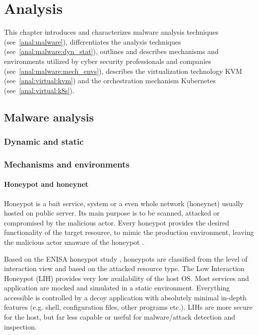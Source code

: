 \chapter{Analysis \label{anal}}
This chapter introduces and characterizes malware analysis techniques (see~\autoref{anal:malware}), differentiates the analysis techniques (see~\autoref{anal:malware:dyn_stat}), outlines and describes mechanisms and environments utilized by cyber security professionals and companies (see~\autoref{anal:malware:mech_envs}), describes the virtualization technology KVM (see~\autoref{anal:virtual:kvm}) and the orchestration mechanism Kubernetes (see~\autoref{anal:virtual:k8s}).\par

\section{Malware analysis \label{anal:malware}}

\subsection{Dynamic and static \label{anal:malware:dyn_stat}}

\subsection{Mechanisms and environments \label{anal:malware:mech_envs}}

\subsubsection{Honeypot and honeynet \label{anal:malware:mech_envs:hons}}
Honeypot is a bait service, system or a even whole network (honeynet) usually hosted on public server. Its main purpose is to be scanned, attacked or compromised by the malicious actor. Every honeypot provides the desired functionality of the target resource, to mimic the production environment, leaving the malicious actor unaware of the honeypot \cite{study:enisa_honeypots}.\par

Based on the ENISA honeypot study \cite{study:enisa_honeypots}, honeypots are classified from the level of interaction view and based on the attacked resource type. The Low Interaction Honeypot (LIH) provides very low availability of the host OS. Most services and application are mocked and simulated in a static environment. Everything accessible is controlled by a decoy application with absolutely minimal in-depth features (e.g. shell, configuration files, other programs etc.). LIHs are more secure for the host, but far less capable or useful for malware/attack detection and inspection.\par

